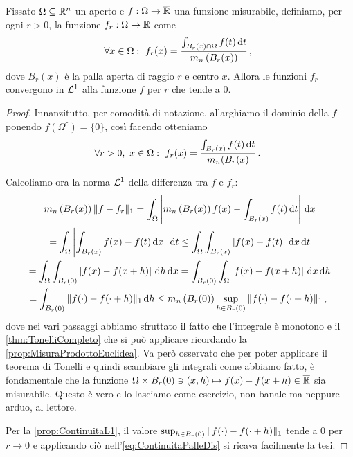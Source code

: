 \begin{lemma}\label{lemma:ContinuitaL1Palle}
	Fissato $\Omega\subseteq \mathbb R^n $ un aperto e $f:\Omega\to\overline{\mathbb R}$ una funzione misurabile, definiamo, per ogni $r>0$, la funzione $f_r:\Omega\to\mathbb R$ come
	\begin{equation*}
		\forall x\in\Omega:\ f_r(x)=\frac{\int_{B_r(x)\cap \Omega}f(t)\de t}{m_n\left(B_r(x)\right)}\virgola
	\end{equation*}
	dove $B_r(x)$ è la palla aperta di raggio $r$ e centro $x$.
	Allora le funzioni $f_r$ convergono in $\mathcal L^1$ alla funzione $f$ per $r$ che tende a $0$.
\end{lemma}
\begin{proof}
	Innanzitutto, per comodità di notazione, allarghiamo il dominio della $f$ ponendo $f(\Omega^{\mathsf c})=\{0\}$, così facendo otteniamo
	\begin{equation*}
		\forall r>0,\ x\in\Omega:\ f_r(x)=\frac{\int_{B_r(x)}f(t)\de t}{m_n(B_r(x)} \punto
	\end{equation*}

	Calcoliamo ora la norma $\mathcal L^1$ della differenza tra $f$ e $f_r$:
	\begin{multline}\label{eq:ContinuitaPalleDis}
		m_n\left(B_r(x)\right)\Vert f-f_r\Vert_1=\int_\Omega \left\lvert m_n\left(B_r(x)\right)f(x)-\int_{B_r(x)}f(t)\,\mathrm d t\right\rvert\,\mathrm d x\\
		=\int_\Omega\left\lvert\int_{B_r(x)}f(x)-f(t)\,\mathrm d x\right\rvert\,\mathrm d t\le \int_\Omega\int_{B_r(x)}\left\lvert f(x)-f(t)\right\rvert\,\mathrm d x\,\mathrm d t\\
		=\int_\Omega\int_{B_r(0)}\left\lvert f(x)-f(x+h)\right\rvert\,\mathrm d h\,\mathrm d x
		=\int_{B_r(0)}\int_\Omega \left\lvert f(x)-f(x+h)\right\rvert\,\mathrm d x\,\mathrm d h\\
		= \int_{B_r(0)}\Vert f(\cdot)-f(\cdot+h)\Vert_1\,\mathrm d h\le m_n\left(B_r(0)\right)\sup_{h\in B_r(0)} \Vert f(\cdot)-f(\cdot+h)\Vert_1\, \text{, }
	\end{multline}
	dove nei vari passaggi abbiamo sfruttato il fatto che l'integrale è monotono e il \cref{thm:TonelliCompleto} che si può applicare ricordando la \cref{prop:MisuraProdottoEuclidea}. Va però osservato che per poter applicare il teorema di Tonelli e quindi scambiare gli integrali come abbiamo fatto, è fondamentale che la funzione $\Omega\times B_r(0)\ni(x,h)\mapsto f(x)-f(x+h)\in\overline{\mathbb R}$ sia misurabile. Questo è vero e lo lasciamo come esercizio, non banale ma neppure arduo, al lettore. %
	
	Per la \cref{prop:ContinuitaL1}, il valore $\sup_{h\in B_r(0)} \Vert f(\cdot)-f(\cdot+h)\Vert_1$ tende a $0$ per $r\to 0$ e applicando ciò nell'\cref{eq:ContinuitaPalleDis} si ricava facilmente la tesi.
\end{proof}




